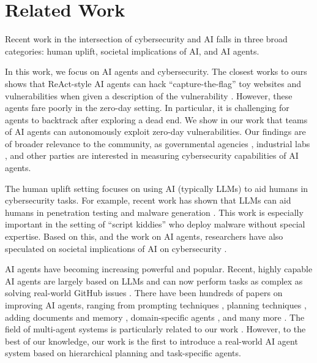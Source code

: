 \section{Related Work}
\label{sec:rel-work}



Recent work in the intersection of cybersecurity and AI falls in three broad
categories: human uplift, societal implications of AI, and AI agents.

In this work, we focus on AI agents and cybersecurity. The closest works to ours
shows that ReAct-style AI agents can hack ``capture-the-flag'' toy websites and
vulnerabilities when given a description of the vulnerability \cite{fang2024llm,
fang2024llm2}. However, these agents fare poorly in the zero-day setting. In
particular, it is challenging for agents to backtrack after exploring a dead
end. We show in our work that teams of AI agents can autonomously exploit
zero-day vulnerabilities. Our findings are of broader relevance to the 
community, as governmental agencies \cite{us-aisi,uk-aisi}, industrial labs 
\cite{weidinger2024holistic,anthropic}, and other parties 
are interested in measuring cybersecurity capabilities of AI agents.

The human uplift setting focuses on using AI (typically LLMs) to aid humans in
cybersecurity tasks. For example, recent work has shown that LLMs can aid humans
in penetration testing and malware generation \cite{happe2023getting,
hilario2024generative}. This work is especially important in the setting of
``script kiddies'' who deploy malware without special expertise. Based on this, 
and the work on AI agents, researchers have also speculated on
societal implications of AI on cybersecurity \cite{lohn2022will,
handa2019machine}.


AI agents have becoming increasing powerful and popular. Recent, highly capable
AI agents are largely based on LLMs \cite{yao2022react, weng2023agent} and can
now perform tasks as complex as solving real-world GitHub issues
\cite{yang2024sweagent}. There have been hundreds of papers on improving AI
agents, ranging from prompting techniques \cite{wei2022chain, yao2024tree},
planning techniques \cite{shinn2024reflexion, liu2023chain}, adding documents
and memory \cite{nuxoll2012enhancing}, domain-specific agents
\cite{he2024webvoyager}, and many more \cite{parisi2022talm}. The field 
of multi-agent systems is particularly related to our work \cite{liu2023dynamic,
chen2023autoagents, zhang2023building}. However, to the best of our knowledge,
our work is the first to introduce a real-world AI agent system based on
hierarchical planning and task-specific agents.


